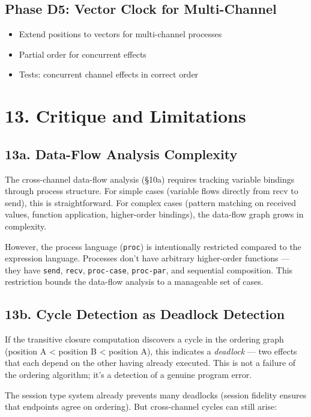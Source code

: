 \documentclass[11pt]{article}
\begin{document}
\subsection{Phase D5: Vector Clock for Multi-Channel}
\label{sec:orga6545ca}
\begin{itemize}
\item Extend positions to vectors for multi-channel processes
\item Partial order for concurrent effects
\item Tests: concurrent channel effects in correct order
\end{itemize}
\section{13. Critique and Limitations}
\label{sec:orga0a3cb3}

\subsection{13a. Data-Flow Analysis Complexity}
\label{sec:org10296d9}

The cross-channel data-flow analysis (§10a) requires tracking variable bindings
through process structure. For simple cases (variable flows directly from recv
to send), this is straightforward. For complex cases (pattern matching on
received values, function application, higher-order bindings), the data-flow
graph grows in complexity.

However, the process language (\texttt{proc}) is intentionally restricted compared to
the expression language. Processes don't have arbitrary higher-order functions —
they have \texttt{send}, \texttt{recv}, \texttt{proc-case}, \texttt{proc-par}, and sequential composition.
This restriction bounds the data-flow analysis to a manageable set of cases.
\subsection{13b. Cycle Detection as Deadlock Detection}
\label{sec:orgb87cceb}

If the transitive closure computation discovers a cycle in the ordering graph
(position A < position B < position A), this indicates a \emph{deadlock} — two
effects that each depend on the other having already executed. This is not a
failure of the ordering algorithm; it's a detection of a genuine program error.

The session type system already prevents many deadlocks (session fidelity ensures
that endpoints agree on ordering). But cross-channel cycles can still arise:
\end{document}
